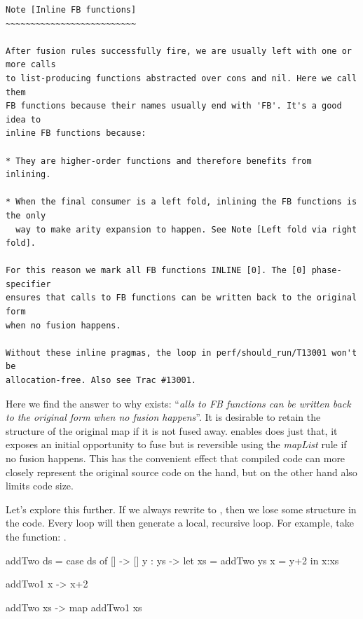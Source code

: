 \begin{listing}[H]
\begin{verbatim}
Note [Inline FB functions]
~~~~~~~~~~~~~~~~~~~~~~~~~~

After fusion rules successfully fire, we are usually left with one or more calls
to list-producing functions abstracted over cons and nil. Here we call them
FB functions because their names usually end with 'FB'. It's a good idea to
inline FB functions because:

* They are higher-order functions and therefore benefits from inlining.

* When the final consumer is a left fold, inlining the FB functions is the only
  way to make arity expansion to happen. See Note [Left fold via right fold].

For this reason we mark all FB functions INLINE [0]. The [0] phase-specifier
ensures that calls to FB functions can be written back to the original form
when no fusion happens.

Without these inline pragmas, the loop in perf/should_run/T13001 won't be
allocation-free. Also see Trac #13001.
\end{verbatim}
\end{listing}

Here we find the answer to why  exists: ``\textit{alls to FB functions can be written back to the original form
when no fusion happens}''. It is desirable to retain the structure of the original map if it is not fused away.  enables does just that,
it exposes an initial opportunity to fuse but is reversible using the \textit{mapList} rule if no fusion happens. This has the convenient effect that 
compiled code can more closely represent the original source code on the hand, but on the other hand also limits code size.

Let's explore this further. If we always rewrite  to  , then we lose some structure in the code.
Every loop will then generate a local, recursive loop. For example, take the function: .

addTwo ds =
      case ds of
        [] -> []
        y : ys ->
          let xs = addTwo ys
              x = y+2
          in x:xs




addTwo1 x -> x+2

addTwo xs -> map addTwo1 xs



